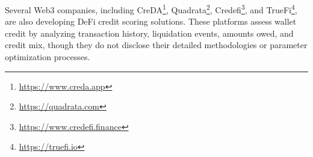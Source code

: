 \documentclass[runningheads]{llncs}
\begin{document}
{Several Web3 companies, including  CreDA\footnote{\href{https://www.creda.app/home}{https://www.creda.app}}, Quadrata\footnote{\href{https://quadrata.com/}{https://quadrata.com}}, Credefi\footnote{\href{https://www.credefi.finance/}{https://www.credefi.finance}}, and TrueFi\footnote{\href{https://truefi.io/}{https://truefi.io}}, are also developing DeFi credit scoring solutions. %
These platforms assess wallet credit by analyzing transaction history, liquidation events, amounts owed, and credit mix, though they do not disclose their detailed methodologies or parameter optimization processes.



}
\end{document}
